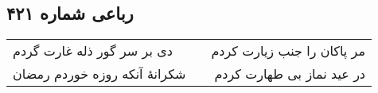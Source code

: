 \begin{center}
\section*{رباعی شماره ۴۲۱}
\label{sec:sh421}
\begin{longtable}{l p{0.5cm} r}
دی بر سر گور ذله غارت گردم
&&
مر پاکان را جنب زیارت کردم
\\
شکرانهٔ آنکه روزه خوردم رمضان
&&
در عید نماز بی طهارت کردم
\\
\end{longtable}
\end{center}
